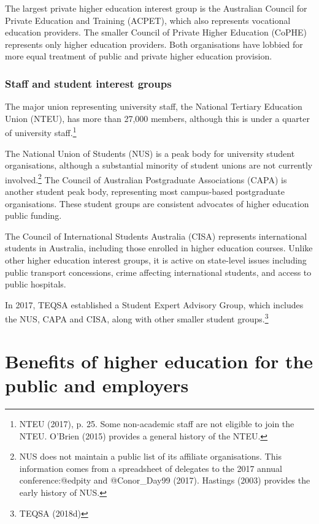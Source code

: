 \documentclass{grattan}
\begin{document}
The largest private higher education interest group is the Australian Council for Private Education and Training (ACPET), which also represents vocational education providers. The smaller Council of Private Higher Education (CoPHE) represents only higher education providers. Both organisations have lobbied for more equal treatment of public and private higher education provision.

%
\subsection{Staff and student interest groups}\label{subsec:staff-and-student-interest-groups}

The major union representing university staff, the National Tertiary Education Union (NTEU), has more than 27,000 members, although this is under a quarter of university staff.\footnote{NTEU (2017), p. 25. Some non-academic staff are not eligible to join the NTEU. O'Brien (2015) provides a general history of the NTEU.}

The National Union of Students (NUS) is a peak body for university student organisations, although a substantial minority of student unions are not currently involved.\footnote{NUS does not maintain a public list of its affiliate organisations. This information comes from a spreadsheet of delegates to the 2017 annual conference:@edpity and @Conor\_Day99 (2017). Hastings (2003) provides the early history of NUS.} The Council of Australian Postgraduate Associations (CAPA) is another student peak body, representing most campus-based postgraduate organisations. These student groups are consistent advocates of higher education public funding.

The Council of International Students Australia (CISA) represents international students in Australia, including those enrolled in higher education courses. Unlike other higher education interest groups, it is active on state-level issues including public transport concessions, crime affecting international students, and access to public hospitals.

In 2017, TEQSA established a Student Expert Advisory Group, which includes the NUS, CAPA and CISA, along with other smaller student groups.\footnote{TEQSA (2018d)}

%
\chapter{Benefits of higher education for the public and employers}\label{chap:benefits-of-higher-education-for-the-public-and-employers}
\end{document}
